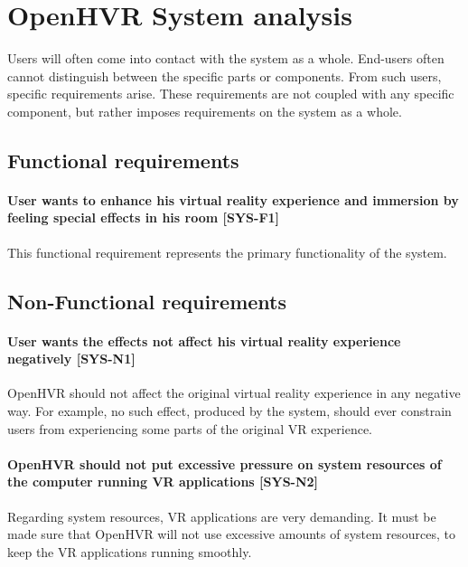 \hypertarget{x-openhvr-system-analysis}{\section{OpenHVR System analysis}}
Users will often come into contact with the system as a whole. End-users
often cannot distinguish between the specific parts or components. From such
users, specific requirements arise. These requirements are not coupled with
any specific component, but rather imposes requirements on the system as a whole.


\subsection*{Functional requirements}
\hypertarget{x-\textbf{user-wants-to-enhance-his-virtual-reality-experience-and-immersion-by-feeling-special-effects-in-his-room}-[sys-f1]}{\paragraph*{\textbf{User wants to enhance his virtual reality experience and immersion by feeling special effects in his room} [SYS-F1]}}
This functional requirement represents the primary functionality of the system.


\subsection*{Non-Functional requirements}
\hypertarget{x-\textbf{user-wants-the-effects-not-affect-his-virtual-reality-experience-negatively}-[sys-n1]}{\paragraph*{\textbf{User wants the effects not affect his virtual reality experience negatively} [SYS-N1]}}
OpenHVR should not affect the original virtual reality experience in any
negative way. For example, no such effect, produced by the system, should ever
constrain users from experiencing some parts of the original VR experience.

\hypertarget{x-\textbf{openhvr-should-not-put-excessive-pressure-on-system-resources-of-the-computer-running-vr-applications}-[sys-n2]}{\paragraph*{\textbf{OpenHVR should not put excessive pressure on system resources of the computer running VR applications} [SYS-N2]}}
Regarding system resources, VR applications are very demanding. It must be
made sure that OpenHVR will not use excessive amounts of system resources,
to keep the VR applications running smoothly.


